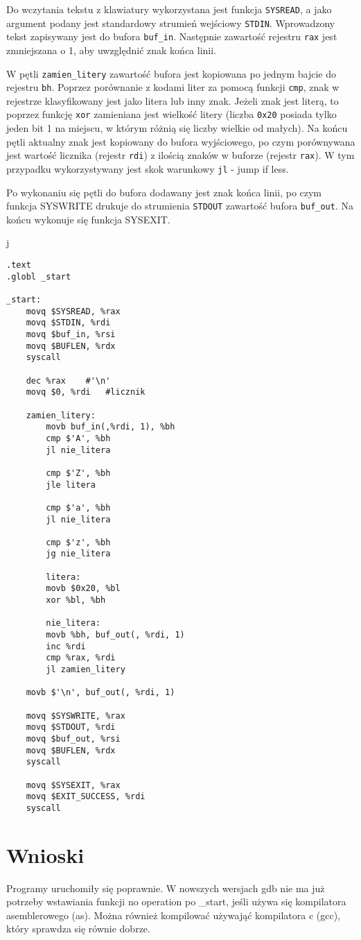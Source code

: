 \documentclass[polish, 11pt]{article}
\begin{document}
		\begin{minipage}{.4\textwidth}
		Do wczytania tekstu z klawiatury wykorzystana jest funkcja \texttt{SYSREAD},
		a jako argument podany jest standardowy strumień wejściowy \texttt{STDIN}.
		Wprowadzony tekst zapisywany jest do bufora \texttt{buf\_in}.
		Następnie zawartość rejestru \texttt{rax} jest zmniejszana o 1, aby uwzględnić znak końca linii.  
		
		\vspace{1cm}
		W pętli \texttt{zamien\_litery} zawartość bufora jest kopiowana po jednym bajcie do rejestru \texttt{bh}.
		Poprzez porównanie z kodami liter za pomocą funkcji \texttt{cmp},
		znak w rejestrze klasyfikowany jest jako litera lub inny znak.		
		Jeżeli znak jest literą, to poprzez funkcję \texttt{xor} zamieniana jest wielkość litery (liczba \texttt{0x20}
		posiada tylko jeden bit 1 na miejscu, w którym różnią się liczby wielkie od małych).
		Na końcu pętli aktualny znak jest kopiowany do bufora wyjściowego,
		po czym porównywana jest wartość licznika (rejestr \texttt{rdi}) z ilością znaków w buforze (rejestr \texttt{rax}).
		W tym przypadku wykorzystywany jest skok warunkowy \texttt{jl} - jump if less.
		
		\vspace{1cm}
		Po wykonaniu się pętli do bufora dodawany jest znak końca linii,
		po czym funkcja SYSWRITE drukuje do strumienia \texttt{STDOUT} zawartość bufora \texttt{buf\_out}.
		Na końcu wykonuje się funkcja SYSEXIT.
		\end{minipage}%
		\hspace{1cm}j
		\begin{minipage}{.5\textwidth}
			\begin{lstlisting}
.text
.globl _start

_start:
    movq $SYSREAD, %rax
    movq $STDIN, %rdi
    movq $buf_in, %rsi
    movq $BUFLEN, %rdx
    syscall

    dec %rax	#'\n'
    movq $0, %rdi	#licznik

    zamien_litery:
        movb buf_in(,%rdi, 1), %bh
        cmp $'A', %bh
        jl nie_litera

        cmp $'Z', %bh
        jle litera

        cmp $'a', %bh
        jl nie_litera

        cmp $'z', %bh
        jg nie_litera

        litera:
        movb $0x20, %bl
        xor %bl, %bh

        nie_litera:
        movb %bh, buf_out(, %rdi, 1)
        inc %rdi
        cmp %rax, %rdi
        jl zamien_litery

    movb $'\n', buf_out(, %rdi, 1)

    movq $SYSWRITE, %rax
    movq $STDOUT, %rdi
    movq $buf_out, %rsi
    movq $BUFLEN, %rdx
    syscall

    movq $SYSEXIT, %rax
    movq $EXIT_SUCCESS, %rdi
    syscall
			\end{lstlisting}
		\end{minipage}
		
	\section{Wnioski}
		Programy uruchomiły się poprawnie.
		W nowszych wersjach gdb nie ma już potrzeby wstawiania funkcji no operation po \_start,
		jeśli używa się kompilatora asemblerowego (as).
		Można również kompilować używająć kompilatora c (gcc), który sprawdza się równie dobrze.
\end{document}
